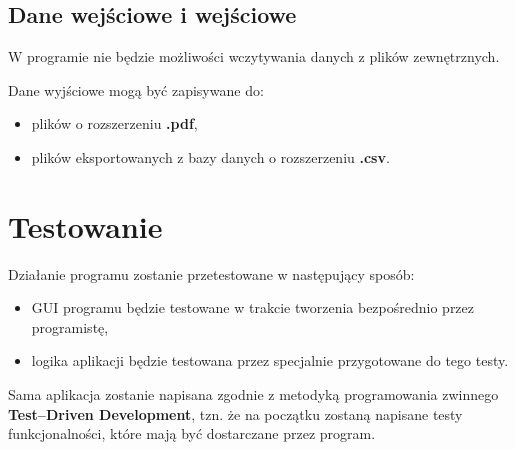 \subsection{Dane wejściowe i wejściowe}
W programie nie będzie możliwości wczytywania danych z plików zewnętrznych. 

Dane wyjściowe mogą być zapisywane do:
\begin{itemize}
\item plików o rozszerzeniu \textbf{.pdf},
\item plików eksportowanych z bazy danych o rozszerzeniu \textbf{.csv}.
\end{itemize}

\section{Testowanie}
Działanie programu zostanie przetestowane w następujący sposób:
\begin{itemize}
\item GUI programu będzie testowane w trakcie tworzenia bezpośrednio przez programistę,
\item logika aplikacji będzie testowana przez specjalnie przygotowane do tego testy.
\end{itemize}
Sama aplikacja zostanie napisana zgodnie z metodyką programowania zwinnego \textbf{Test--Driven Development}, tzn. że na początku zostaną napisane testy funkcjonalności, które mają być dostarczane przez program. 
